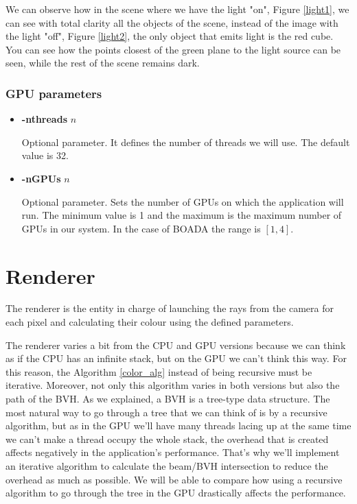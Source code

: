 \documentclass[titlepage,12pt]{report}
\begin{document}
\begin{itemize}
We can observe how in the scene where we have the light "on", Figure \ref{light1}, we can see with total clarity all the objects of the scene, instead of the image with the light "off", Figure \ref{light2}, the only object that emits light is the red cube. You can see how the points closest of the green plane to the light source can be seen, while the rest of the scene remains dark.

\end{itemize}

\subsubsection{GPU parameters}

\begin{itemize}

\item \textbf{-nthreads} $n$

Optional parameter. It defines the number of threads we will use. The default value is 32.

\item \textbf{-nGPUs} $n$

Optional parameter. Sets the number of GPUs on which the application will run. The minimum value is 1 and the maximum is the maximum number of GPUs in our system. In the case of BOADA the range is $[1,4]$.


\end{itemize}

\section{Renderer}

The renderer is the entity in charge of launching the rays from the camera for each pixel and calculating their colour using the defined parameters.

The renderer varies a bit from the CPU and GPU versions because we can think as if the CPU has an infinite stack, but on the GPU we can't think this way. For this reason, the Algorithm \ref{color_alg} instead of being recursive must be iterative. Moreover, not only this algorithm varies in both versions but also the path of the BVH. As we explained, a BVH is a tree-type data structure. The most natural way to go through a tree that we can think of is by a recursive algorithm, but as in the GPU we'll have many threads lacing up at the same time we can't make a thread occupy the whole stack, the overhead that is created affects negatively in the application's performance. That's why we'll implement an iterative algorithm to calculate the beam/BVH intersection to reduce the overhead as much as possible. We will be able to compare how using a recursive algorithm to go through the tree in the GPU drastically affects the performance.
\end{document}
